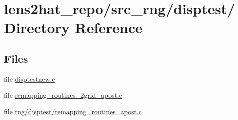 \section{lens2hat\-\_\-repo/src\-\_\-rng/disptest/ Directory Reference}
\label{dir_9be02230c9667e2b031126f403294414}
\subsection*{Files}
\begin{DoxyCompactItemize}
\item 
file \hyperlink{disptestnew_8c}{disptestnew.\-c}
\item 
file \hyperlink{remapping__routines__2grid__apost_8c}{remapping\-\_\-routines\-\_\-2grid\-\_\-apost.\-c}
\item 
file \hyperlink{rng_2disptest_2remapping__routines__apost_8c}{rng/disptest/remapping\-\_\-routines\-\_\-apost.\-c}
\end{DoxyCompactItemize}
